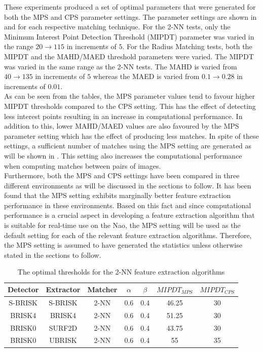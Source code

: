 \documentclass{report}
\begin{document}
These experiments produced a set of optimal parameters that were generated for both the MPS and CPS parameter settings. The parameter settings are shown in  and  for each respective matching technique. For the 2-NN tests, only the Minimum Interest Point Detection Threshold (MIPDT) parameter was varied in the range $20 \rightarrow 115$ in increments of $5$. For the Radius Matching tests, both the MIPDT and the MAHD/MAED threshold parameters were varied. The MIPDT was varied in the same range as the 2-NN tests. The MAHD is varied from $40 \rightarrow 135$ in increments of $5$ whereas the MAED is varied from $0.1 \rightarrow 0.28$ in increments of $0.01$.\\

As can be seen from the tables, the MPS parameter values tend to favour higher MIPDT thresholds compared to the CPS setting. This has the effect of detecting less interest points resulting in an increase in computational performance. In addition to this, lower MAHD/MAED values are also favoured by the MPS parameter setting which has the effect of producing less matches. In spite of these settings, a sufficient number of matches using the MPS setting are generated as will be shown in . This setting also increases the computational performance when computing matches between pairs of images.\\

Furthermore, both the MPS and CPS settings have been compared in three different environments as will be discussed in the sections to follow. It has been found that the MPS setting exhibits marginally better feature extraction performance in these environments. Based on this fact and since computational performance is a crucial aspect in developing a feature extraction algorithm that is suitable for real-time use on the Nao, the MPS setting will be used as the default setting for each of the relevant feature extraction algorithms. Therefore, the MPS setting is assumed to have generated the statistics unless otherwise stated in the sections to follow.\\

\begin{table}
\caption{The optimal thresholds for the 2-NN feature extraction algorithms}
\footnotesize
\begin{tabular}{|c|c|c|c|c|c|c|}
\hline 
Detector & Extractor & Matcher & $\alpha$ & $\beta$ & $MIPDT_{MPS}$ & $MIPDT_{CPS}$\tabularnewline
\hline 
\hline 
S-BRISK & S-BRISK & 2-NN & 0.6 & 0.4 & 46.25 & 30\tabularnewline
\hline 
BRISK4 & BRISK4 & 2-NN & 0.6 & 0.4 & 51.25 & 30\tabularnewline
\hline 
BRISK0 & SURF2D & 2-NN & 0.6 & 0.4 & 43.75 & 30\tabularnewline
\hline 
BRISK0 & UBRISK & 2-NN & 0.6 & 0.4 & 55 & 35\tabularnewline
\hline 
\end{tabular}
\label{tab:knnStatistics}
\end{table}
\end{document}
